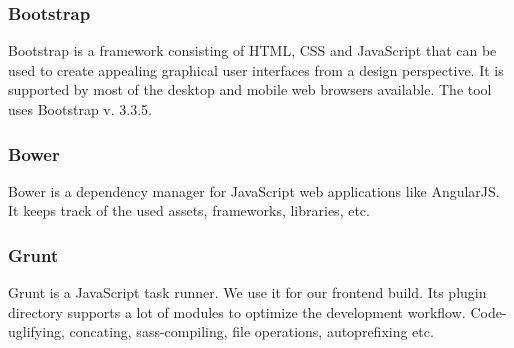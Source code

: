 \subsubsection{Bootstrap}
Bootstrap is a framework consisting of HTML, CSS and JavaScript that can be used to create appealing graphical user interfaces from a design perspective. It is supported by most of the desktop and mobile web browsers available. The tool uses Bootstrap v. 3.3.5. \cite{bootstrap}

\subsubsection{Bower}
Bower is a dependency manager for JavaScript web applications like AngularJS. It keeps track of the used assets, frameworks, libraries, etc. \cite{bower}  

\subsubsection{Grunt}
Grunt is a JavaScript task runner. We use it for our frontend build. Its plugin directory supports a lot of modules to optimize the development workflow. Code-uglifying, concating, sass-compiling, file operations, autoprefixing etc. \cite{grunt} 

